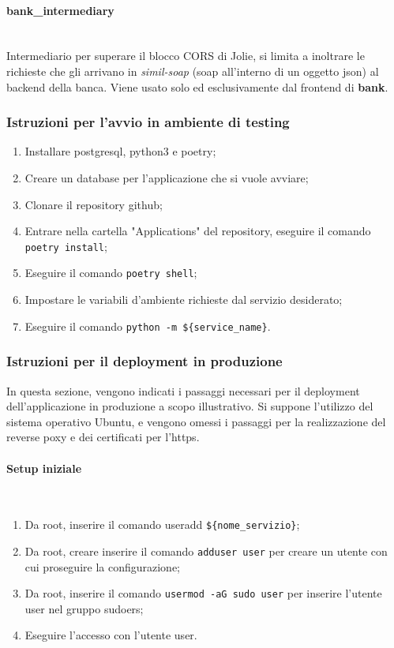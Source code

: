 \documentclass[11pt]{article} %
\begin{document}
\paragraph{bank\_intermediary}\mbox{}\\
Intermediario per superare il blocco CORS di Jolie, si limita a inoltrare le richieste che gli arrivano in \emph{simil-soap} (soap all'interno di un oggetto json) al backend della banca. Viene usato solo ed esclusivamente dal frontend di \textbf{bank}.

\subsubsection{Istruzioni per l'avvio in ambiente di testing}

\begin{enumerate}
\item Installare postgresql, python3 e poetry;
\item Creare un database per l'applicazione che si vuole avviare;
\item Clonare il repository github;
\item Entrare nella cartella "Applications" del repository, eseguire il comando \verb|poetry install|;
\item Eseguire il comando \verb|poetry shell|;
\item Impostare le variabili d'ambiente richieste dal servizio desiderato;
\item Eseguire il comando \verb|python -m ${service_name}|.
\end{enumerate}

\subsubsection{Istruzioni per il deployment in produzione}

In questa sezione, vengono indicati i passaggi necessari per il deployment dell'applicazione in produzione a scopo illustrativo. Si suppone l'utilizzo del sistema operativo Ubuntu, e vengono omessi i passaggi per la realizzazione del reverse poxy e dei certificati per l'https.

\paragraph{Setup iniziale}\mbox{}\\

\begin{enumerate}
\item Da root, inserire il comando useradd \verb|${nome_servizio}|;
\item Da root, creare inserire il comando \verb|adduser user| per creare un utente con cui proseguire la configurazione;
\item Da root, inserire il comando \verb|usermod -aG sudo user| per inserire l'utente user nel gruppo sudoers;
\item Eseguire l'accesso con l'utente user.
\end{enumerate}
\end{document}
